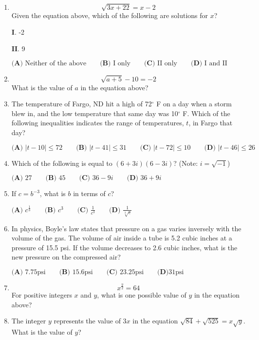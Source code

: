 \documentclass[../satmath.tex]{subfiles}
\begin{document}
\begin{enumerate}[label=\bfseries\arabic*.]
\item 
\[\sqrt{3x+22}=x-2\]
Given the equation above, which of the following are solutions for $x$?

$\textbf{I.}$ -2 

$\textbf{II.}$ 9

$\textbf{(A) } \text{Neither of the above} \qquad \textbf{(B) } \text{I only} \qquad \textbf{(C) } \text{II only} \qquad \textbf{(D) } \text{I and II}$ 

\item 
\[\sqrt{a+5}-10=-2\]
What is the value of $a$ in the equation above?
 
\item The temperature of Fargo, ND hit a high of 72$^{\circ}$ F on a day when a storm blew in, and the low temperature that same day was 
10$^{\circ}$ F. Which of the following inequalities indicates the range of temperatures, $t$, in Fargo that day?

$\textbf{(A) } |t-10|\leq 72 \qquad \textbf{(B) } |t-41|\leq 31 \qquad \textbf{(C) } |t-72|\leq 10 \qquad \textbf{(D) } |t-46|\leq 26$
 
\item Which of the following is equal to $(6+3i)(6-3i)$? (Note: $i=\sqrt{-1}$)

$\textbf{(A) } 27 \qquad \textbf{(B) } 45 \qquad \textbf{(C) } 36-9i \qquad \textbf{(D) } 36+9i$
 
\item If $c=b^{-3}$, what is $b$ in terms of $c$?

$\textbf{(A) } c^{\frac{1}{3}} \qquad \textbf{(B) } c^3 \qquad \textbf{(C) } \frac{1}{c^3} \qquad \textbf{(D) } \frac{1}{\sqrt[3]{c}}$

\item In physics, Boyle's law states that pressure on a gas varies inversely with the volume of the gas. The volume of air inside a tube is 
5.2 cubic inches at a pressure of 15.5 psi. If the volume decreases to 2.6 cubic inches, what is the new pressure on the compressed air?

$\textbf{(A) } 7.75 \text{psi} \qquad \textbf{(B) } 15.6 \text{psi} \qquad \textbf{(C) } 23.25 \text{psi} \qquad \textbf{(D)} 31 \text{psi} $
 
\item 
\[x^{\frac{y}{2}}=64\]
For positive integers $x$ and $y$, what is one possible value of $y$ in the equation above?
 
\item The integer $y$ represents the value of $3x$ in the equation $\sqrt{84}+\sqrt{525}=x\sqrt{y}$. What is the value of $y$?
 

\end{enumerate}
\end{document}
